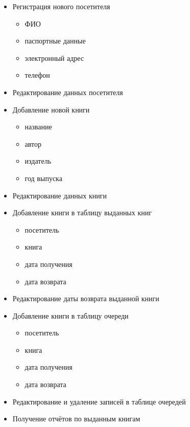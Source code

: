 \documentclass[a4paper,10pt]{article}
\begin{document}
                \begin{itemize}
                    \item Регистрация нового посетителя
                        \begin{itemize}
                            \item ФИО
                            \item паспортные данные
                            \item электронный адрес
                            \item телефон
                        \end{itemize}
                    \item Редактирование данных посетителя
                    \item Добавление новой книги
                        \begin{itemize}
                            \item название
                            \item автор
                            \item издатель
                            \item год выпуска
                        \end{itemize}
                    \item Редактирование данных книги
                    \item Добавление книги в таблицу выданных книг
                        \begin{itemize}
                            \item посетитель
                            \item книга
                            \item дата получения 
                            \item дата возврата
                        \end{itemize}
                    \item Редактирование даты возврата выданной книги
                    \item Добавление книги в таблицу очереди
                        \begin{itemize}
                            \item посетитель
                            \item книга
                            \item дата получения 
                            \item дата возврата
                        \end{itemize}
                    \item Редактирование и удаление записей в таблице очередей
                    \item Получение отчётов по выданным книгам
                \end{itemize}
\end{document}
